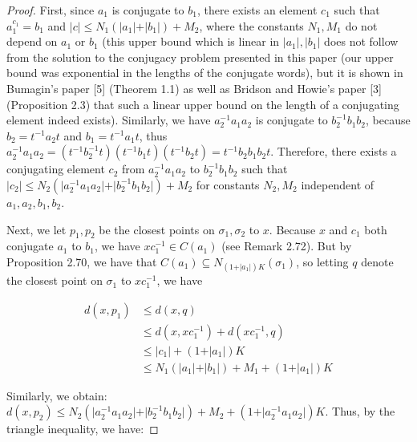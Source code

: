 \documentclass[12pt]{article}
\newcommand{\vs}{\vskip10pt}
\begin{document}
\begin{proof}
		First, since $a_1$ is conjugate to $b_1$, there exists an element $c_1$ such that $a_1^{c_1} = b_1$ and $\vert c \vert \leq N_1 (\vert a_1 \vert + \vert b_1 \vert) + M_2$, where the constants $N_1, M_1$ do not depend on $a_1$ or $b_1$ (this upper bound which is linear in $\vert a_1 \vert, \vert b_1 \vert$ does not follow from the solution to the conjugacy problem presented in this paper (our upper bound was exponential in the lengths of the conjugate words), but it is shown in Bumagin's paper [5] (Theorem 1.1) as well as Bridson and Howie's paper [3] (Proposition 2.3) that such a linear upper bound on the length of a conjugating element indeed exists). Similarly, we have $a_2^{-1} a_1 a_2$ is conjugate to $b_2^{-1} b_1 b_2$, because $b_2 = t^{-1} a_2 t$ and $b_1 = t^{-1} a_1 t$, thus $a_2^{-1} a_1 a_2 = (t^{-1} b_2^{-1} t) (t^{-1} b_1 t) (t^{-1} b_2 t) = t^{-1} b_2 b_1 b_2 t$. Therefore, there exists a conjugating element $c_2$ from $a_2^{-1} a_1 a_2$ to $b_2^{-1} b_1 b_2$ such that $\vert c_2 \vert \leq N_2 (\vert a_2^{-1} a_1 a_2 \vert + \vert b_2^{-1} b_1 b_2 \vert) + M_2$ for constants $N_2, M_2$ independent of $a_1,a_2,b_1,b_2$.  
				
		\vs 
		
		Next, we let $p_1, p_2$ be the closest points on $\sigma_1, \sigma_2$ to $x$. Because $x$ and $c_1$ both conjugate $a_1$ to $b_1$, we have $xc _1^{-1} \in C(a_1)$ (see Remark 2.72). But by Proposition 2.70, we have that $C(a_1) \subseteq N_{(1 + \vert a_1 \vert)K}(\sigma_1)$, so letting $q$ denote the closest point on $\sigma_1$ to $xc_1^{-1}$, we have 
		
		\begin{align*}
		d(x, p_1) &\leq d(x, q) \\
		&\leq d(x, xc_1^{-1}) + d(xc_1^{-1}, q) \\
		&\leq \vert c_1 \vert + (1 + \vert a_1 \vert)K \\
		&\leq N_1 (\vert a_1 \vert + \vert b_1 \vert) + M_1 + (1 + \vert a_1 \vert)K
		\end{align*}
		
		
		Similarly, we obtain: $d(x, p_2) \leq N_2 (\vert a_2^{-1} a_1 a_2 \vert + \vert b_2^{-1} b_1 b_2 \vert) + M_2 + (1 + \vert a_2 ^{-1} a_1 a_2 \vert)K$. Thus, by the triangle inequality, we have:
		

\end{proof}
\end{document}
